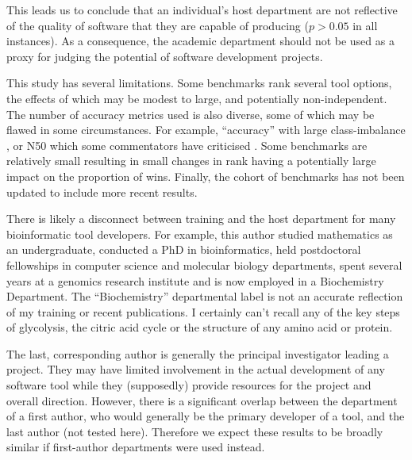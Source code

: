 \documentclass[fleqn,10pt,doc,onecolumn]{SelfArx}%
\begin{document}
This leads us to conclude that an individual's host department are not
reflective of the quality of software that they are capable of
producing ($p>0.05$ in all instances). As a consequence, the academic
department should not be used as a proxy for judging the potential of
software development projects.


This study has several limitations. Some benchmarks rank several tool
options, the effects of which may be modest to large, and potentially
non-independent. The number of accuracy metrics used is also diverse,
some of which may be flawed in some circumstances. For example,
``accuracy'' with large class-imbalance \cite{luque2019impact}, or N50
which some commentators have criticised \cite{xie2021pdr}. Some
benchmarks are relatively small resulting in small changes in rank
having a potentially large impact on the proportion of wins. Finally,
the cohort of benchmarks has not been updated to include more recent
results.

There is likely a disconnect between training and the host department
for many bioinformatic tool developers. For example, this author
studied mathematics as an undergraduate, conducted a PhD in
bioinformatics, held postdoctoral fellowships in computer science and
molecular biology departments, spent several years at a genomics
research institute and is now employed in a Biochemistry
Department. The ``Biochemistry'' departmental label is not an accurate
reflection of my training or recent publications. I certainly can't
recall any of the key steps of glycolysis, the citric acid cycle or
the structure of any amino acid or protein.

The last, corresponding author is generally the principal investigator
leading a project. They may have limited involvement in the actual
development of any software tool while they (supposedly) provide
resources for the project and overall direction. However, there is a
significant overlap between the department of a first author, who
would generally be the primary developer of a tool, and the last
author (not tested here). Therefore we expect these results to be
broadly similar if first-author departments were used instead. 

%                

\end{document}
